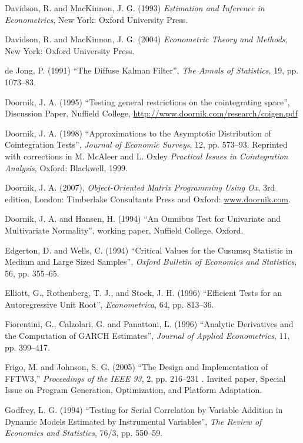 \begin{thebibliography}
  Davidson, R. and MacKinnon, J. G. (1993) \emph{Estimation and
    Inference in Econometrics}, New York: Oxford University Press.

  Davidson, R. and MacKinnon, J. G. (2004) \emph{Econometric Theory
    and Methods}, New York: Oxford University Press.

  de Jong, P. (1991) ``The Diffuse Kalman Filter'', \emph{The Annals
    of Statistics}, 19, pp. 1073--83.

  Doornik, J. A. (1995) ``Testing general restrictions on the
  cointegrating space'', Discussion Paper, Nuffield College,
  \url{http://www.doornik.com/research/coigen.pdf}

  Doornik, J. A. (1998) ``Approximations to the Asymptotic
  Distribution of Cointegration Tests'', \emph{Journal of Economic
    Surveys}, 12, pp. 573--93.  Reprinted with corrections in M.
  McAleer and L. Oxley \emph{Practical Issues in Cointegration
    Analysis}, Oxford: Blackwell, 1999.

  Doornik, J. A. (2007), \emph{Object-Oriented Matrix Programming
    Using Ox}, 3rd edition, London: Timberlake Consultants Press and
  Oxford: \url{www.doornik.com}.

  Doornik, J. A. and Hansen, H. (1994) ``An Omnibus Test for
  Univariate and Multivariate Normality'', working paper, Nuffield
  College, Oxford.

  Edgerton, D. and Wells, C. (1994) ``Critical Values for the Cusumsq
  Statistic in Medium and Large Sized Samples'', \emph{Oxford Bulletin
    of Economics and Statistics}, 56, pp. 355--65.

  Elliott, G., Rothenberg, T. J., and Stock, J. H. (1996) ``Efficient
  Tests for an Autoregressive Unit Root'', \emph{Econometrica}, 64,
  pp. 813--36.

  Fiorentini, G., Calzolari, G. and Panattoni, L. (1996) ``Analytic
  Derivatives and the Computation of GARCH Estimates'', \emph{Journal
    of Applied Econometrics}, 11, pp. 399--417.

  Frigo, M. and Johnson, S. G. (2005) ``The Design and Implementation of
  FFTW3,'' \emph{Proceedings of the IEEE 93}, 2, pp. 216--231 . Invited
  paper, Special Issue on Program Generation, Optimization, and Platform
  Adaptation.
  
  Godfrey, L. G. (1994) ``Testing for Serial Correlation by Variable
  Addition in Dynamic Models Estimated by Instrumental Variables'', 
  \emph{The Review of Economics and Statistics}, 76/3, pp. 550--59.


\end{thebibliography}
